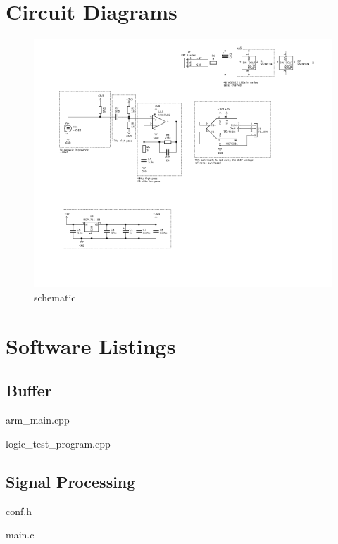 \documentclass[a4paper]{article}
\begin{document}
\section{Circuit Diagrams}
\begin{figure}[H]
\begin{center}
\includegraphics[width=500pt]{appendixC/schematic-cropped.png}
\caption{schematic}
\label{fig:schem}
\end{center}
\end{figure}

\section{Software Listings}

\subsection{Buffer}
arm\_main.cpp


logic\_test\_program.cpp


\subsection{Signal Processing}
conf.h


main.c

\end{document}

